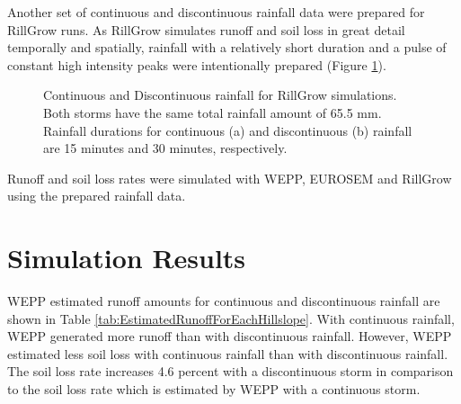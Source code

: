 Another set of continuous and discontinuous rainfall data were prepared for
RillGrow runs. As RillGrow simulates runoff and soil loss in great detail
temporally and spatially, rainfall with a relatively short duration and a pulse
of constant high intensity peaks were intentionally prepared (Figure
\ref{fig:rg2_input_continuous}).

\begin{figure}[htpb]
  \centering
  \caption{Continuous and Discontinuous rainfall for RillGrow simulations. Both
storms have the same total rainfall amount of 65.5 mm. Rainfall durations for
continuous (a) and discontinuous (b) rainfall are 15 minutes and 30 minutes,
respectively.}
  \label{fig:rg2_input_continuous}
\end{figure}

Runoff and soil loss rates were simulated with WEPP, EUROSEM and RillGrow using
the prepared rainfall data.

\section{Simulation Results}
\label{sec:InterStormGapsSimulatedResults}

WEPP estimated runoff amounts for continuous and discontinuous rainfall are
shown in Table \ref{tab:EstimatedRunoffForEachHillslope}. With continuous
rainfall, WEPP generated more runoff than with discontinuous rainfall. However,
WEPP estimated less soil loss with continuous rainfall than with discontinuous
rainfall. The soil loss rate increases 4.6 percent with a discontinuous storm in
comparison to the soil loss rate which is estimated by WEPP with a continuous
storm.

